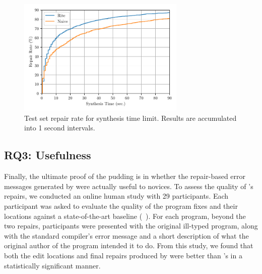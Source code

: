 \begin{figure}
  \centering
  \includegraphics[height=2.2in]{cdf.pdf}
  \caption{Test set repair rate for synthesis time limit. Results are accumulated into 1 second intervals.}
  \label{fig:rite_naive}
\end{figure}

\subsection{RQ3: Usefulness}
\label{sec:eval:useful}

Finally, the ultimate proof of the pudding is in whether the repair-based
error messages generated by \toolname were actually useful to novices.
%
To assess the quality of \toolname's repairs, we conducted an online human
study with 29 participants.
%
Each participant was asked to evaluate the quality of the program fixes
and their locations against a state-of-the-art baseline
(\seminal ~\citep{Lerner2007-dt}).
%
For each program, beyond the two repairs, participants were presented
with the original ill-typed program, along with the standard \ocaml
compiler's error message and a short description of what the original
author of the program intended it to do.
%
From this study, we found that both the edit locations and final
repairs produced by \toolname were better than
\seminal's in a statistically significant manner.


